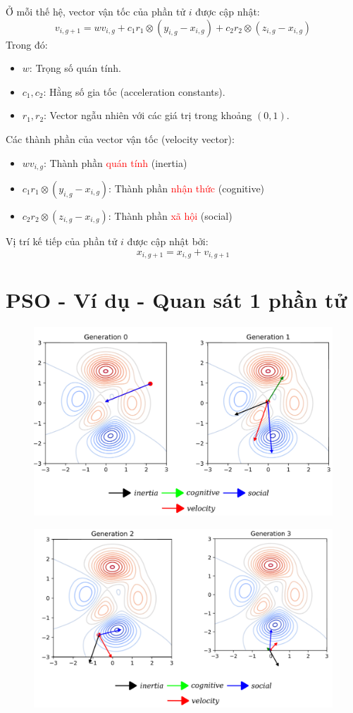 \documentclass{book}
\begin{document}
Ở mỗi thế hệ, vector vận tốc của phần tử $i$ được cập nhật:
$$ v_{i,g+1} = wv_{i,g} + c_1r_1\otimes(y_{i,g} - x_{i,g}) + c_2r_2\otimes(z_{i,g} - x_{i,g}) $$
Trong đó:
\begin{itemize}
    \item $w$: Trọng số quán tính.
    \item $c_1, c_2$: Hằng số gia tốc (acceleration constants).
    \item $r_1, r_2$: Vector ngẫu nhiên với các giá trị trong khoảng $(0,1)$.
\end{itemize}

Các thành phần của vector vận tốc (velocity vector):
\begin{itemize}
    \item $wv_{i,g}$: Thành phần \textcolor{red}{quán tính} (inertia)
    \item $c_1r_1\otimes(y_{i,g} - x_{i,g})$: Thành phần \textcolor{red}{nhận thức} (cognitive)
    \item $c_2r_2\otimes(z_{i,g} - x_{i,g})$: Thành phần \textcolor{red}{xã hội} (social)
\end{itemize}

Vị trí kế tiếp của phần tử $i$ được cập nhật bởi:
$$ x_{i,g+1} = x_{i,g} + v_{i,g+1} $$

\section{PSO - Ví dụ - Quan sát 1 phần tử}
\begin{figure}[H]
    \centering
    \includegraphics[width=0.75\linewidth]{images/GA-3_45.png}
\end{figure}

\begin{figure}[H]
    \centering
    \includegraphics[width=0.75\linewidth]{images/GA-3_46.png}
\end{figure}
\end{document}
